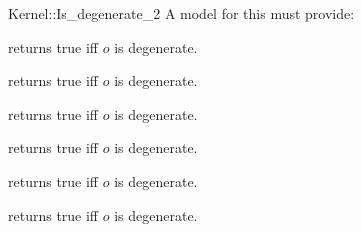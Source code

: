 \begin{ccRefFunctionObjectConcept}{Kernel::Is_degenerate_2}
A model for this must provide:


{returns true iff $o$ is degenerate.}

{returns true iff $o$ is degenerate.}

{returns true iff $o$ is degenerate.}

{returns true iff $o$ is degenerate.}

{returns true iff $o$ is degenerate.}

{returns true iff $o$ is degenerate.}

\ccIsModel{}

\end{ccRefFunctionObjectConcept}
